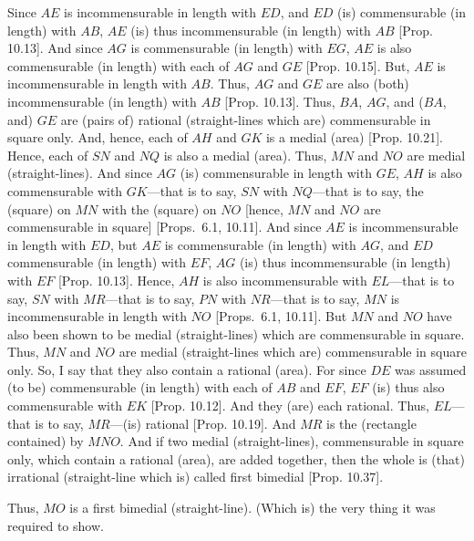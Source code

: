 \begin{Parallel}{}{}
{Since $AE$
is incommensurable in length with $ED$, and $ED$ (is) commensurable 
 (in length) with $AB$, $AE$ (is) thus incommensurable (in length) with $AB$ [Prop. 10.13]. And since $AG$
is commensurable (in length) with $EG$, $AE$ is also commensurable
(in length) with each of $AG$ and $GE$ [Prop. 10.15]. 
But, $AE$ is incommensurable in length with $AB$.  Thus, $AG$ and $GE$
are also (both) 
incommensurable (in length) with $AB$ [Prop. 10.13]. 
Thus, $BA$, $AG$,  and ($BA$, and) $GE$ are (pairs of) rational (straight-lines which are)
commensurable in square only. And, hence, each of $AH$ and $GK$ is a medial
(area) [Prop. 10.21]. Hence, each of $SN$ and $NQ$
is also a medial (area). Thus, $MN$ and $NO$ are medial (straight-lines). 
And since $AG$ (is) commensurable in length with $GE$, $AH$
is also commensurable with $GK$---that is to say, $SN$ with $NQ$---that is to say, the (square)
on $MN$  with the (square) on $NO$ [hence, $MN$ and $NO$
are commensurable in square] [Props.~6.1, 10.11]. And since $AE$ is incommensurable
in length with $ED$, but $AE$ is commensurable (in length) with $AG$,
and $ED$ commensurable (in length) with $EF$, $AG$ (is) thus
incommensurable (in length) with $EF$ [Prop. 10.13]. Hence, $AH$ is also incommensurable with $EL$---that is to say, $SN$ with $MR$---that is to
say, $PN$ with $NR$---that is to say, $MN$ is incommensurable
in length with $NO$  [Props.~6.1, 10.11]. But $MN$ and $NO$ have also
been shown to be medial (straight-lines) which are commensurable in square. 
Thus, $MN$ and $NO$ are medial (straight-lines which are) commensurable
in square only.
So,
I say that they also contain a rational (area). For since $DE$ was assumed
(to be) commensurable (in length) with each of $AB$ and $EF$, $EF$
(is) thus also commensurable with $EK$ [Prop. 10.12]. And they (are) each rational.
Thus, $EL$---that is to say, $MR$---(is) rational [Prop. 10.19]. And $MR$ is the (rectangle contained) by $MNO$. And if two medial (straight-lines), commensurable
in square only, which contain a rational (area), are added together, then the
whole is (that) irrational (straight-line which is)
called first bimedial [Prop. 10.37].

Thus, $MO$ is a first bimedial (straight-line). (Which is) the very thing it
was required to show.}
\end{Parallel}



